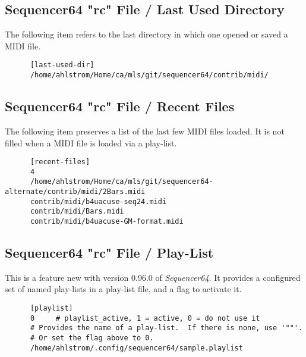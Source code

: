 \subsection{Sequencer64 "rc" File / Last Used Directory}
\label{subsec:seq64_rc_file_last_used_dir}

   The following item refers to the last directory in which one opened or
   saved a MIDI file.

   \begin{verbatim}
      [last-used-dir]
      /home/ahlstrom/Home/ca/mls/git/sequencer64/contrib/midi/
   \end{verbatim}

\subsection{Sequencer64 "rc" File / Recent Files}
\label{subsec:seq64_rc_file_recent_files}

   The following item preserves a list of the last few MIDI files loaded.
   It is not filled when a MIDI file is loaded via a play-list.

   \begin{verbatim}
      [recent-files]
      4
      /home/ahlstrom/Home/ca/mls/git/sequencer64-alternate/contrib/midi/2Bars.midi
      contrib/midi/b4uacuse-seq24.midi
      contrib/midi/Bars.midi
      contrib/midi/b4uacuse-GM-format.midi
   \end{verbatim}

\subsection{Sequencer64 "rc" File / Play-List}
\label{subsec:seq64_rc_file_playlist}

   This is a feature new with version 0.96.0 of \textsl{Sequencer64}.
   It provides a configured set of named play-lists in a play-list file,
   and a flag to activate it.
   
   \begin{verbatim}
      [playlist]
      0     # playlist_active, 1 = active, 0 = do not use it
      # Provides the name of a play-list.  If there is none, use '""'.
      # Or set the flag above to 0.
      /home/ahlstrom/.config/sequencer64/sample.playlist
   \end{verbatim}


